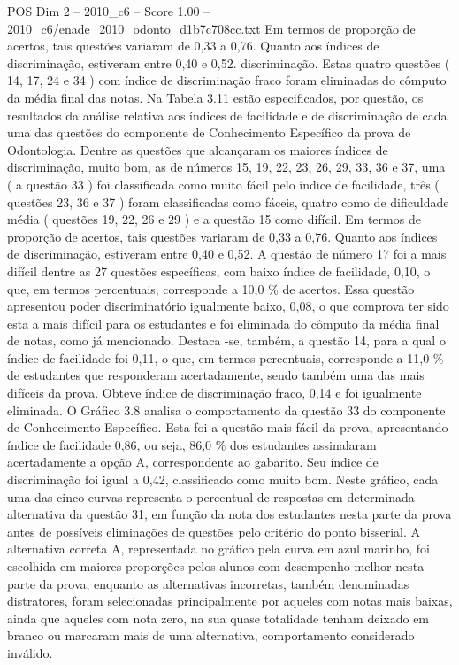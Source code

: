 \begin{textsample}{POS Dim 2 – 2010\_c6 – Score 1.00 – 2010\_c6/enade\_2010\_odonto\_d1b7c708cc.txt}
Em termos de proporção de acertos, tais questões variaram de 0,33 a 0,76.
Quanto aos índices de discriminação, estiveram entre 0,40 e 0,52. discriminação.
Estas quatro questões ( 14, 17, 24 e 34 ) com índice de discriminação fraco foram eliminadas do cômputo da média final das notas.
Na Tabela 3.11 estão especificados, por questão, os resultados da análise relativa aos índices de facilidade e de discriminação de cada uma das questões do componente de Conhecimento Específico da prova de Odontologia.
Dentre as questões que alcançaram os maiores índices de discriminação, muito bom, as de números 15, 19, 22, 23, 26, 29, 33, 36 e 37, uma ( a questão 33 ) foi classificada como muito fácil pelo índice de facilidade, três ( questões 23, 36 e 37 ) foram classificadas como fáceis, quatro como de dificuldade média ( questões 19, 22, 26 e 29 ) e a questão 15 como difícil.
Em termos de proporção de acertos, tais questões variaram de 0,33 a 0,76.
Quanto aos índices de discriminação, estiveram entre 0,40 e 0,52.
A questão de número 17 foi a mais difícil dentre as 27 questões específicas, com baixo índice de facilidade, 0,10, o que, em termos percentuais, corresponde a 10,0 \% de acertos.
Essa questão apresentou poder discriminatório igualmente baixo, 0,08, o que comprova ter sido esta a mais difícil para os estudantes e foi eliminada do cômputo da média final de notas, como já mencionado.
Destaca -se, também, a questão 14, para a qual o índice de facilidade foi 0,11, o que, em termos percentuais, corresponde a 11,0 \% de estudantes que responderam acertadamente, sendo também uma das mais difíceis da prova.
Obteve índice de discriminação fraco, 0,14 e foi igualmente eliminada.
O Gráfico 3.8 analisa o comportamento da questão 33 do componente de Conhecimento Específico.
Esta foi a questão mais fácil da prova, apresentando índice de facilidade 0,86, ou seja, 86,0 \% dos estudantes assinalaram acertadamente a opção A, correspondente ao gabarito.
Seu índice de discriminação foi igual a 0,42, classificado como muito bom.
Neste gráfico, cada uma das cinco curvas representa o percentual de respostas em determinada alternativa da questão 31, em função da nota dos estudantes nesta parte da prova antes de possíveis eliminações de questões pelo critério do ponto bisserial.
A alternativa correta A, representada no gráfico pela curva em azul marinho, foi escolhida em maiores proporções pelos alunos com desempenho melhor nesta parte da prova, enquanto as alternativas incorretas, também denominadas distratores, foram selecionadas principalmente por aqueles com notas mais baixas, ainda que aqueles com nota zero, na sua quase totalidade tenham deixado em branco ou marcaram mais de uma alternativa, comportamento considerado inválido.

\end{textsample}
